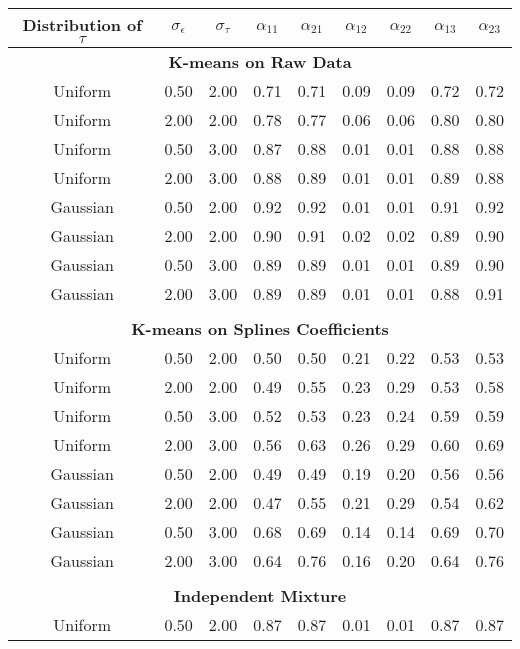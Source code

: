 \begin{table}[ht]
\begin{center}
\begin{tabular}{ccc|cccccc}
  \hline Distribution of $\tau$&$\sigma_{\epsilon}$&$\sigma_{\tau}$&$\alpha_{11}$&$\alpha_{21}$&$\alpha_{12}$&$\alpha_{22}$&$\alpha_{13}$&$\alpha_{23}$\\ \hline\multicolumn{9}{c}{\textbf{K-means on Raw Data}}\\ Uniform & 0.50 & 2.00 & 0.71 & 0.71 & 0.09 & 0.09 & 0.72 & 0.72 \\ 
  Uniform & 2.00 & 2.00 & 0.78 & 0.77 & 0.06 & 0.06 & 0.80 & 0.80 \\ 
  Uniform & 0.50 & 3.00 & 0.87 & 0.88 & 0.01 & 0.01 & 0.88 & 0.88 \\ 
  Uniform & 2.00 & 3.00 & 0.88 & 0.89 & 0.01 & 0.01 & 0.89 & 0.88 \\ 
  Gaussian & 0.50 & 2.00 & 0.92 & 0.92 & 0.01 & 0.01 & 0.91 & 0.92 \\ 
  Gaussian & 2.00 & 2.00 & 0.90 & 0.91 & 0.02 & 0.02 & 0.89 & 0.90 \\ 
  Gaussian & 0.50 & 3.00 & 0.89 & 0.89 & 0.01 & 0.01 & 0.89 & 0.90 \\ 
  Gaussian & 2.00 & 3.00 & 0.89 & 0.89 & 0.01 & 0.01 & 0.88 & 0.91 \\ 
   \\ \multicolumn{9}{c}{\textbf{K-means on Splines Coefficients}}\\Uniform & 0.50 & 2.00 & 0.50 & 0.50 & 0.21 & 0.22 & 0.53 & 0.53 \\ 
  Uniform & 2.00 & 2.00 & 0.49 & 0.55 & 0.23 & 0.29 & 0.53 & 0.58 \\ 
  Uniform & 0.50 & 3.00 & 0.52 & 0.53 & 0.23 & 0.24 & 0.59 & 0.59 \\ 
  Uniform & 2.00 & 3.00 & 0.56 & 0.63 & 0.26 & 0.29 & 0.60 & 0.69 \\ 
  Gaussian & 0.50 & 2.00 & 0.49 & 0.49 & 0.19 & 0.20 & 0.56 & 0.56 \\ 
  Gaussian & 2.00 & 2.00 & 0.47 & 0.55 & 0.21 & 0.29 & 0.54 & 0.62 \\ 
  Gaussian & 0.50 & 3.00 & 0.68 & 0.69 & 0.14 & 0.14 & 0.69 & 0.70 \\ 
  Gaussian & 2.00 & 3.00 & 0.64 & 0.76 & 0.16 & 0.20 & 0.64 & 0.76 \\ 
   \\ \multicolumn{9}{c}{\textbf{Independent Mixture}}\\Uniform & 0.50 & 2.00 & 0.87 & 0.87 & 0.01 & 0.01 & 0.87 & 0.87 \\ 

\end{tabular}
\end{center}
\end{table}

